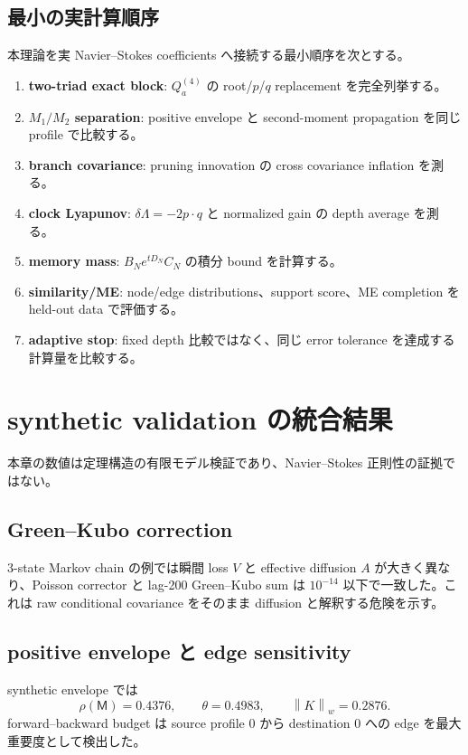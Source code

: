 \documentclass[11pt,a4paper,openany]{book}
\numberwithin{equation}{chapter}
\newcommand{\norm}[1]{\left\lVert #1\right\rVert}
\begin{document}
\section{最小の実計算順序}
本理論を実 Navier--Stokes coefficients へ接続する最小順序を次とする。
\begin{enumerate}
\item \textbf{two-triad exact block}: $Q_a^{(4)}$ の root/$p$/$q$ replacement を完全列挙する。
\item \textbf{$M_1/M_2$ separation}: positive envelope と second-moment propagation を同じ profile で比較する。
\item \textbf{branch covariance}: pruning innovation の cross covariance inflation を測る。
\item \textbf{clock Lyapunov}: $\delta\Lambda=-2p\cdot q$ と normalized gain の depth average を測る。
\item \textbf{memory mass}: $B_Ne^{tD_N}C_N$ の積分 bound を計算する。
\item \textbf{similarity/ME}: node/edge distributions、support score、ME completion を held-out data で評価する。
\item \textbf{adaptive stop}: fixed depth 比較ではなく、同じ error tolerance を達成する計算量を比較する。
\end{enumerate}

\chapter{synthetic validation の統合結果}
本章の数値は定理構造の有限モデル検証であり、Navier--Stokes 正則性の証拠ではない。

\section{Green--Kubo correction}
3-state Markov chain の例では瞬間 loss $V$ と effective diffusion $A$ が大きく異なり、Poisson corrector と lag-200 Green--Kubo sum は $10^{-14}$ 以下で一致した。これは raw conditional covariance をそのまま diffusion と解釈する危険を示す。

\section{positive envelope と edge sensitivity}
synthetic envelope では
\[
\rho(\mathsf M)=0.4376,
\qquad
\theta=0.4983,
\qquad
\norm{K}_w=0.2876.
\]
forward--backward budget は source profile $0$ から destination $0$ への edge を最大重要度として検出した。
\end{document}
